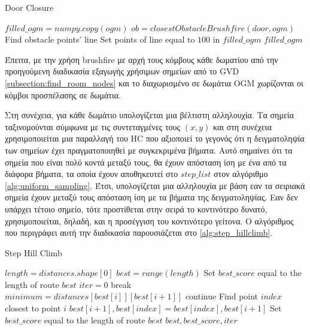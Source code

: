 \begin{algorithm}[!htb]
\caption{Door Closure}
\label{alg:door_closure}
\begin{algorithmic}[1]
    \State $filled\_ogm = numpy.copy(ogm)$
        \State $ob = closestObstacleBrushfire(door, ogm)$
        \State Find obstacle points' line
        \State Set points of line equal to $100$ in $filled\_ogm$
    \EndFor
    \State \Return $filled\_ogm$
\end{algorithmic}
\end{algorithm}


Έπειτα, με την χρήση brushfire με αρχή τους κόμβους κάθε δωματίου από την προηγούμενη διαδικασία εξαγωγής χρήσιμων σημείων από το GVD \ref{subsection:find_room_nodes} και το διαχωρισμένο σε δωμάτια OGM χωρίζονται οι κόμβοι προσπέλασης σε δωμάτια.

Στη συνέχεια, για κάθε δωμάτιο υπολογίζεται μια βέλτιστη αλληλουχία. Τα σημεία ταξινομούνται σύμφωνα με τις συντεταγμένες τους $(x,y)$ και στη συνέχεια χρησιμοποιείται μια παραλλαγή του HC που αξιοποιεί το γεγονός ότι η δειγματοληψία των σημείων έχει πραγματοποιηθεί με συγκεκριμένα βήματα. Αυτό σημαίνει ότι τα σημεία που είναι πολύ κοντά μεταξύ τους, θα έχουν απόσταση ίση με ένα από τα διάφορα βήματα, τα οποία έχουν αποθηκευτεί στο $step\_list$ στον αλγόριθμο \ref{alg:uniform_sampling}. Έτσι, υπολογίζεται μια αλληλουχία με βάση εαν τα σειριακά σημεία έχουν μεταξύ τους απόσταση ίση με τα βήματα της δειγματοληψίας. Εαν δεν υπάρχει τέτοιο σημείο, τότε προστίθεται στην σειρά το κοντινότερο δυνατό, χρησιμοποιείται, δηλαδή, και η προσέγγιση του κοντινότερο γείτονα. Ο αλγόριθμος που περιγράφει αυτή την διαδικασία παρουσιάζεται στο \ref{alg:step_hillclimb}.



\begin{algorithm}[!htb]
\caption{Step Hill Climb}
\label{alg:step_hillclimb}
\begin{algorithmic}[1]
    \State $length = distances.shape[0]$
    \State $best = range(length)$
    \State Set $best\_score$ equal to the length of route $best$
    \State $iter = 0$
            \State break
        \EndIf
        \State $minimum = distances[best[i]][best[i+1]]$
            \State continue
        \Else
            \State Find point $index$ closest to point $i$
            \State $best[i+1], best[index] = best[index], best[i+1]$
            \State Set $best\_score$ equal to the length of route $best$
        \EndIf
    \EndFor
    \State \Return $best, best\_score, iter$
\end{algorithmic}
\end{algorithm}

